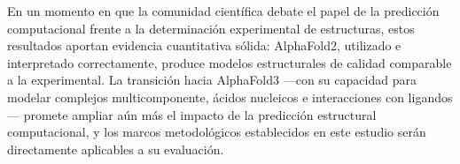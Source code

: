 En un momento en que la comunidad cient\'ifica debate el papel de la predicci\'on
computacional frente a la determinaci\'on experimental de estructuras, estos
resultados aportan evidencia cuantitativa s\'olida: AlphaFold2, utilizado e
interpretado correctamente, produce modelos estructurales de calidad comparable a la
experimental. La transici\'on hacia AlphaFold3 ---con su capacidad para modelar
complejos multicomponente, \'acidos nucleicos e interacciones con ligandos--- promete
ampliar a\'un m\'as el impacto de la predicci\'on estructural computacional, y los
marcos metodol\'ogicos establecidos en este estudio ser\'an directamente aplicables
a su evaluaci\'on.
